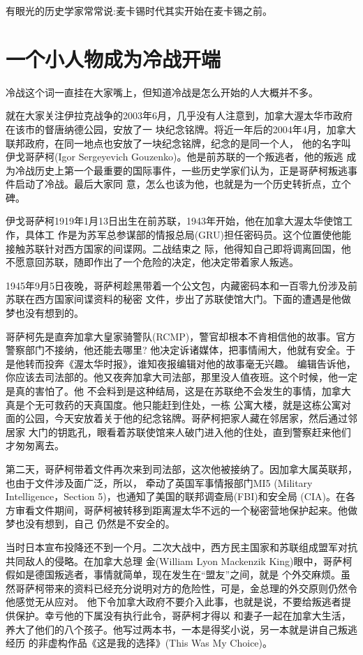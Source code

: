 \documentclass[10pt]{article}
\begin{document}
{有眼光的历史学家常常说:麦卡锡时代其实开始在麦卡锡之前。

\pagebreak
\section{一个小人物成为冷战开端}

冷战这个词一直挂在大家嘴上，但知道冷战是怎么开始的人大概并不多。

就在大家关注伊拉克战争的2003年6月，几乎没有人注意到，加拿大渥太华市政府在该市的督唐纳德公园，安放了一
块纪念铭牌。将近一年后的2004年4月，加拿大联邦政府，在同一地点也安放了一块纪念铭牌，纪念的是同一个人，
他的名字叫伊戈\textperiodcentered 哥萨柯(Igor Sergeyevich Gouzenko)。他是前苏联的一个叛逃者，他的叛逃
成为冷战历史上第一个最重要的国际事件，一些历史学家们认为，正是哥萨柯叛逃事件启动了冷战。最后大家同
意，怎么也该为他，也就是为一个历史转折点，立个碑。

伊戈\textperiodcentered 哥萨柯1919年1月13日出生在前苏联，1943年开始，他在加拿大渥太华使馆工作，具体工
作是为苏军总参谋部的情报总局(GRU)担任密码员。这个位置使他能接触苏联针对西方国家的间谍网。二战结束之
际，他得知自己即将调离回国，他不愿意回苏联，随即作出了一个危险的决定，他决定带着家人叛逃。

1945年9月5日夜晚，哥萨柯趁黑带着一个公文包，内藏密码本和一百零九份涉及前苏联在西方国家间谍资料的秘密
文件，步出了苏联使馆大门。下面的遭遇是他做梦也没有想到的。

哥萨柯先是直奔加拿大皇家骑警队(RCMP)，警官却根本不肯相信他的故事。官方警察部门不接纳，他还能去哪里?
他决定诉诸媒体，把事情闹大，他就有安全。于是他转而投奔《渥太华时报》，谁知夜报编辑对他的故事毫无兴趣。
编辑告诉他，你应该去司法部的。他又夜奔加拿大司法部，那里没人值夜班。这个时候，他一定是真的害怕了。他
不会料到是这种结局，这是在苏联绝不会发生的事情，加拿大真是个无可救药的天真国度。他只能赶到住处，一栋
公寓大楼，就是这栋公寓对面的公园，今天安放着关于他的纪念铭牌。哥萨柯把家人藏在邻居家，然后通过邻居家
大门的钥匙孔，眼看着苏联使馆来人破门进入他的住处，直到警察赶来他们才匆匆离去。

第二天，哥萨柯带着文件再次来到司法部，这次他被接纳了。因加拿大属英联邦，也由于文件涉及面广泛，所以，
牵动了英国军事情报部门MI5 (Military Intelligence，Section 5)，也通知了美国的联邦调查局(FBI)和安全局
(CIA)。在各方审看文件期间，哥萨柯被转移到距离渥太华不远的一个秘密营地保护起来。他做梦也没有想到，自己
仍然是不安全的。


当时日本宣布投降还不到一个月。二次大战中，西方民主国家和苏联组成盟军对抗共同敌人的侵略。在加拿大总理
金(William Lyon Mackenzik King)眼中，哥萨柯假如是德国叛逃者，事情就简单，现在发生在``盟友''之间，就是
个外交麻烦。虽然哥萨柯带来的资料已经充分说明对方的危险性，可是，金总理的外交原则仍然令他感觉无从应对。
他下令加拿大政府不要介入此事，也就是说，不要给叛逃者提供保护。幸亏他的下属没有执行此令，哥萨柯才得以
和妻子一起在加拿大生活，养大了他们的八个孩子。他写过两本书，一本是得奖小说，另一本就是讲自己叛逃经历
的非虚构作品《这是我的选择》(This Was My Choice)。


}
\end{document}
